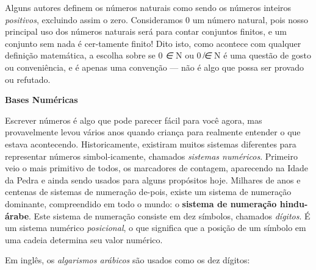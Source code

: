 \documentclass[
]{article}
\begin{document}
Alguns autores definem os números naturais como sendo os números
inteiros \emph{positivos}, excluindo assim o zero. Consideramos 0 um
número natural, pois nosso principal uso dos números naturais será para
contar conjuntos finitos, e um conjunto sem nada é cer-tamente finito!
Dito isto, como acontece com qualquer definição matemática, a escolha
sobre se 0 \emph{∈} N ou 0 \emph{̸∈} N é uma questão de gosto ou
conveniência, e é apenas uma convenção --- não é algo que possa ser
provado ou refutado.

\textbf{Bases Numéricas}

Escrever números é algo que pode parecer fácil para você agora, mas
provavelmente levou vários anos quando criança para realmente entender o
que estava acontecendo. Historicamente, existiram muitos sistemas
diferentes para representar números simbol-icamente, chamados
\emph{sistemas numéricos}. Primeiro veio o mais primitivo de todos, os
marcadores de contagem, aparecendo na Idade da Pedra e ainda sendo
usados para alguns propósitos hoje. Milhares de anos e centenas de
sistemas de numeração de-pois, existe um sistema de numeração dominante,
compreendido em todo o mundo: o \textbf{sistema de numeração
hindu-árabe}. Este sistema de numeração consiste em dez símbolos,
chamados \emph{dígitos}. É um sistema numérico \emph{posicional}, o que
significa que a posição de um símbolo em uma cadeia determina seu valor
numérico.

Em inglês, os \emph{algarismos arábicos} são usados como os dez dígitos:
\end{document}
